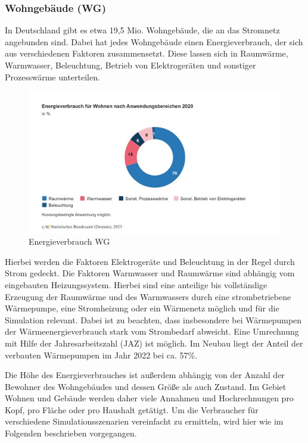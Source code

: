 \subsubsection{Wohngebäude (WG)}

In Deutschland gibt es etwa 19,5 Mio. Wohngebäude, die an das Stromnetz angebunden sind. Dabei hat jedes Wohngebäude einen Energieverbrauch, der sich aus verschiedenen Faktoren zusammensetzt. 
Diese lassen sich in Raumwärme, Warmwasser, Beleuchtung, Betrieb von Elektrogeräten und sonstiger Prozesswärme unterteilen. 

\begin{figure}[h!]
    \centering
    \includegraphics[width=14cm]{Abbildungen/VerbraucherAbb1.jpg}
    \caption{Energieverbrauch WG\cite{destatisenergie}}\label{fig:Energieverbrauch_WG}
\end{figure}

Hierbei werden die Faktoren Elektrogeräte und Beleuchtung in der Regel durch Strom gedeckt. 
Die Faktoren Warmwasser und Raumwärme sind abhängig vom eingebauten Heizungssystem. 
Hierbei sind eine anteilige bis vollständige Erzeugung der Raumwärme und des Warmwassers durch eine strombetriebene Wärmepumpe, eine Stromheizung oder ein Wärmenetz möglich und für die Simulation relevant. 
Dabei ist zu beachten, dass insbesondere bei Wärmepumpen der Wärmeenergieverbrauch stark vom Strombedarf abweicht. 
Eine Umrechnung mit Hilfe der Jahresarbeitszahl (JAZ) ist möglich. 
Im Neubau liegt der Anteil der verbauten Wärmepumpen im Jahr 2022 bei ca. 57\%.

Die Höhe des Energieverbrauches ist außerdem abhängig von der Anzahl der Bewohner des Wohngebäudes und dessen Größe als auch Zustand. 
Im Gebiet Wohnen und Gebäude werden daher viele Annahmen und Hochrechnungen pro Kopf, pro Fläche oder pro Haushalt getätigt. Um die Verbraucher für verschiedene Simulationsszenarien vereinfacht zu ermitteln, wird hier wie im Folgenden beschrieben vorgegangen. 

